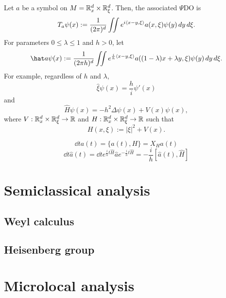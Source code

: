\documentclass{../../large}
\begin{document}
Let $a$ be a symbol on $M=\mathbb{R}_x^d\times\mathbb{R}_\xi^d$.
Then, the associated $\Psi$DO is
\[T_a\psi(x):=\frac1{(2\pi)^d}\iint e^{i\langle x-y,\xi\rangle}a(x,\xi)\psi(y)\,dy\,d\xi.\]
For parameters $0\le\lambda\le1$ and $h>0$, let
\[\hat a\psi(x):=\frac1{(2\pi h)^d}\iint e^{\frac ih\<x-y,\xi\>}a((1-\lambda)x+\lambda y,\xi)\psi(y)\,dy\,d\xi.\]
For example, regardless of $h$ and $\lambda$,
\[\hat\xi\psi(x)=\frac hi\psi'(x)\]
and
\[\hat H\psi(x)=-h^2\Delta\psi(x)+V(x)\psi(x),\]
where $V:\mathbb{R}_x^d\times\mathbb{R}_\xi^d\to\mathbb{R}$ and $H:\mathbb{R}_x^d\times\mathbb{R}_\xi^d\to\mathbb{R}$ such that
\[H(x,\xi):=|\xi|^2+V(x).\]


\[\dd{t}a(t)=\{a(t),H\}=X_Ha(t)\]
\[\dd{t}\hat a(t)=\dd{t}e^{\frac iht\hat H}\hat ae^{-\frac iht\hat H}=-\frac ih[\hat a(t),\hat H]\]




\chapter{Semiclassical analysis}
\section{Weyl calculus}
\begin{prb}

\end{prb}

\section{Heisenberg group}

\chapter{Microlocal analysis}
\end{document}
